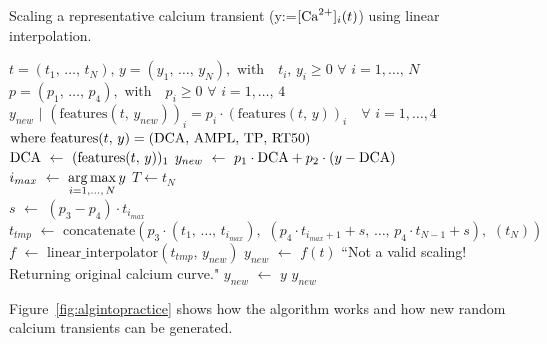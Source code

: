 \begin{algorithm}
    \caption{Scaling a representative calcium transient (y:=$[\textrm{Ca}^{2+}]_{i}(t)$) using linear interpolation.}\label{alg:cascaling}
    \begin{algorithmic} 
    \REQUIRE $t=(t_1,\,\dots,\,t_N),\,y=(y_1,\,\dots,\,y_N),\,\,\textrm{with}\quad t_i,\,y_i\ge 0\,\,\forall\,\,i=1,\dots,\,N$ \\ $p=(p_1,\,\dots,\,p_4),\,\,\textrm{with}\quad p_i\ge 0\,\,\forall\,\,i=1,\dots,\,4$
    \ENSURE $y_{new}\,\,|\,\,(\textrm{features}(t,\,y_{new}))_{i} = p_i\cdot(\textrm{features}(t,\,y))_{i}\quad\forall\,\,i=1,\dots,4$ \\ $\textrm{where}\,\,\textrm{features}(t,\,y) = (\textrm{DCA},\,\textrm{AMPL},\,\textrm{TP},\,\textrm{RT50})$ \\ \vspace{0.2cm}
    \STATE $\textrm{DCA}\,\,\leftarrow\,\,(\textrm{features}(t,\,y))_1$
    \STATE $y_{new}\,\,\leftarrow\,\,p_1\cdot\textrm{DCA} + p_2\cdot(y-\textrm{DCA})$
    \STATE $i_{max}\,\,\leftarrow\,\,\operatorname*{arg\,max}\limits_{i=1,\dots,\,N}{y}$
    \STATE $T \leftarrow t_{N}$ \\
    \vspace{0.2cm}
    \STATE $s\,\,\leftarrow\,\,(p_3 - p_4)\cdot t_{i_{max}}$
    \STATE $t_{tmp}\,\,\leftarrow\,\,\textrm{concatenate}(p_3\cdot (t_{1},\,\dots,\,t_{i_{max}}),\,\,(p_4\cdot t_{i_{max}+1}+s,\,\dots,\,p_4\cdot t_{N-1}+s),\,\,(t_{N}))$
    \STATE $f\,\,\leftarrow\,\,\textrm{linear\_interpolator}(t_{tmp},\, y_{new})$
    \STATE $y_{new}\,\,\leftarrow\,\,f(t)$
    \ELSE
    \PRINT ``Not a valid scaling! Returning original calcium curve."
    \STATE $y_{new}\,\,\leftarrow\,\,y$
    \ENDIF
    \RETURN $y_{new}$
    \end{algorithmic}
\end{algorithm}

\vspace{0.2cm}
Figure~\ref{fig:algintopractice} shows how the algorithm works and how new random calcium transients can be generated.

